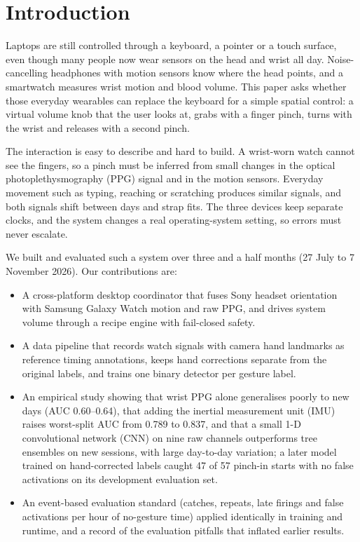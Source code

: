
\section{Introduction}

Laptops are still controlled through a keyboard, a pointer or a touch surface, even though many people now wear sensors on the head and wrist all day. Noise-cancelling headphones with motion sensors know where the head points, and a smartwatch measures wrist motion and blood volume. This paper asks whether those everyday wearables can replace the keyboard for a simple spatial control: a virtual volume knob that the user looks at, grabs with a finger pinch, turns with the wrist and releases with a second pinch.

The interaction is easy to describe and hard to build. A wrist-worn watch cannot see the fingers, so a pinch must be inferred from small changes in the optical photoplethysmography (PPG) signal and in the motion sensors. Everyday movement such as typing, reaching or scratching produces similar signals, and both signals shift between days and strap fits. The three devices keep separate clocks, and the system changes a real operating-system setting, so errors must never escalate.

We built and evaluated such a system over three and a half months (27 July to 7 November 2026). Our contributions are:
\begin{itemize}
  \item A cross-platform desktop coordinator that fuses Sony headset orientation with Samsung Galaxy Watch motion and raw PPG, and drives system volume through a recipe engine with fail-closed safety.
  \item A data pipeline that records watch signals with camera hand landmarks as reference timing annotations, keeps hand corrections separate from the original labels, and trains one binary detector per gesture label.
  \item An empirical study showing that wrist PPG alone generalises poorly to new days (AUC 0.60--0.64), that adding the inertial measurement unit (IMU) raises worst-split AUC from 0.789 to 0.837, and that a small 1-D convolutional network (CNN) on nine raw channels outperforms tree ensembles on new sessions, with large day-to-day variation; a later model trained on hand-corrected labels caught 47 of 57 pinch-in starts with no false activations on its development evaluation set.
  \item An event-based evaluation standard (catches, repeats, late firings and false activations per hour of no-gesture time) applied identically in training and runtime, and a record of the evaluation pitfalls that inflated earlier results.
\end{itemize}

